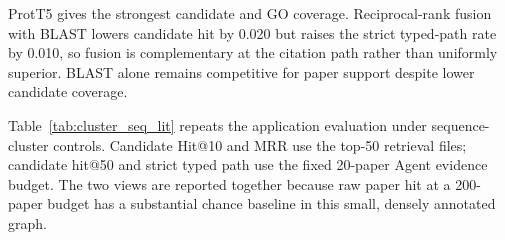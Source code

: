 \documentclass[11pt]{article}
\begin{document}
\begin{table}[t]
\centering
\caption{Budget-matched deterministic evidence evaluation on the 99-query SeqLit-DAG split. GO bridge recall measures expected GO coverage; strict path requires a typed candidate-to-GO-to-expected-PMID route.}
\label{tab:agent_evidence_eval}
\end{table}

ProtT5 gives the strongest candidate and GO coverage. Reciprocal-rank fusion with BLAST lowers candidate hit by 0.020 but raises the strict typed-path rate by 0.010, so fusion is complementary at the citation path rather than uniformly superior. BLAST alone remains competitive for paper support despite lower candidate coverage.

Table~\ref{tab:cluster_seq_lit} repeats the application evaluation under sequence-cluster controls. Candidate Hit@10 and MRR use the top-50 retrieval files; candidate hit@50 and strict typed path use the fixed 20-paper Agent evidence budget. The two views are reported together because raw paper hit at a 200-paper budget has a substantial chance baseline in this small, densely annotated graph.
\end{document}
